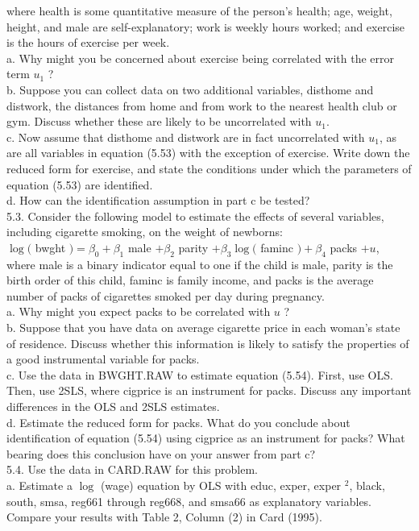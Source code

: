 \documentclass[10pt]{article}
\begin{document}
where health is some quantitative measure of the person's health; age, weight, height, and male are self-explanatory; work is weekly hours worked; and exercise is the hours of exercise per week.\\
a. Why might you be concerned about exercise being correlated with the error term $u_{1}$ ?\\
b. Suppose you can collect data on two additional variables, disthome and distwork, the distances from home and from work to the nearest health club or gym. Discuss whether these are likely to be uncorrelated with $u_{1}$.\\
c. Now assume that disthome and distwork are in fact uncorrelated with $u_{1}$, as are all variables in equation (5.53) with the exception of exercise. Write down the reduced form for exercise, and state the conditions under which the parameters of equation (5.53) are identified.\\
d. How can the identification assumption in part c be tested?\\
5.3. Consider the following model to estimate the effects of several variables, including cigarette smoking, on the weight of newborns:\\
$\log ($ bwght $)=\beta_{0}+\beta_{1}$ male $+\beta_{2}$ parity $+\beta_{3} \log ($ faminc $)+\beta_{4}$ packs $+u$,\\
where male is a binary indicator equal to one if the child is male, parity is the birth order of this child, faminc is family income, and packs is the average number of packs of cigarettes smoked per day during pregnancy.\\
a. Why might you expect packs to be correlated with $u$ ?\\
b. Suppose that you have data on average cigarette price in each woman's state of residence. Discuss whether this information is likely to satisfy the properties of a good instrumental variable for packs.\\
c. Use the data in BWGHT.RAW to estimate equation (5.54). First, use OLS. Then, use 2SLS, where cigprice is an instrument for packs. Discuss any important differences in the OLS and 2SLS estimates.\\
d. Estimate the reduced form for packs. What do you conclude about identification of equation (5.54) using cigprice as an instrument for packs? What bearing does this conclusion have on your answer from part c?\\
5.4. Use the data in CARD.RAW for this problem.\\
a. Estimate a $\log$ (wage) equation by OLS with educ, exper, exper ${ }^{2}$, black, south, smsa, reg661 through reg668, and smsa66 as explanatory variables. Compare your results with Table 2, Column (2) in Card (1995).\\
\end{document}
